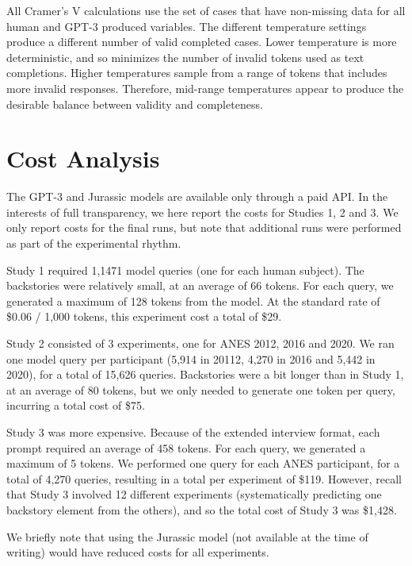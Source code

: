 \documentclass[11pt]{article}
\begin{document}
All Cramer's V calculations use the set of cases that have non-missing data for all human and GPT-3 produced variables. The different temperature settings produce a different number of valid completed cases. Lower temperature is more deterministic, and so minimizes the number of invalid tokens used as text completions. Higher temperatures sample from a range of tokens that includes more invalid responses. Therefore, mid-range temperatures appear to produce the desirable balance between validity and completeness.


\section{Cost Analysis}

The GPT-3 and Jurassic models are available only through a paid API. In the interests of full transparency, we here report the costs for Studies 1, 2 and 3. We only report costs for the final runs, but note that additional runs were performed as part of the experimental rhythm.

Study 1 required 1,1471 model queries (one for each human subject). The backstories were relatively small, at an average of 66 tokens. For each query, we generated a maximum of 128 tokens from the model. At the standard rate of \$0.06 / 1,000 tokens, this experiment cost a total of \$29.

Study 2 consisted of 3 experiments, one for ANES 2012, 2016 and 2020. We ran one model query per participant (5,914 in 20112, 4,270 in 2016 and 5,442 in 2020), for a total of 15,626 queries. Backstories were a bit longer than in Study 1, at an average of 80 tokens, but we only needed to generate one token per query, incurring a total cost of \$75.

Study 3 was more expensive. Because of the extended interview format, each prompt required an average of 458 tokens. For each query, we generated a maximum of 5 tokens.  We performed one query for each ANES participant, for a total of 4,270 queries, resulting in a total per experiment of \$119.  However, recall that Study 3 involved 12 different experiments (systematically predicting one backstory element from the others), and so the total cost of Study 3 was \$1,428.

We briefly note that using the Jurassic model (not available at the time of writing) would have reduced costs for all experiments.
\end{document}

